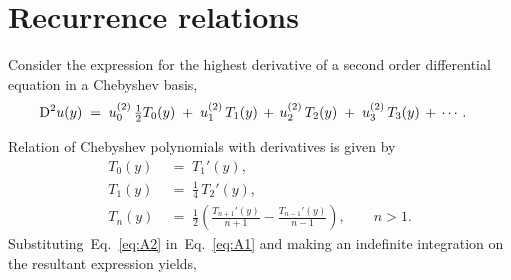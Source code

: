 \documentclass[%
secnumarabic,%
 amssymb, amsmath,%
 aps,prf,superscriptaddress,longbibliography
frontmatterverbose,
]{revtex4-2}
\begin{document}
\section{Recurrence relations}\label{app:ind-int}
Consider the expression for the highest derivative of a second order differential equation in a Chebyshev basis,
\begin{align}\label{eq:A1}
  \mathrm D^2 u (y) \;&=\; u_0^{(2)} \,\tfrac{1}{2}T_0(y) \;+\; u_1^{(2)}\,T_1(y) \,+\, u_2^{(2)}\,T_2(y) \;+\; u_3^{(2)}\,T_3(y) \,+\, \cdots.
\end{align}

Relation of Chebyshev polynomials with derivatives is given by~\cite[Equation 3.25]{chebExpanExact}
\begin{subequations}\label{eq:A2}
\begin{align}
  T_0(y) \;&=\; T_1'(y),\\
  T_1(y) \;&=\; \tfrac{1}{4}\,T_2'(y),\\
  T_n(y) \;&=\; \tfrac{1}{2}\left( \frac{T_{n+1}'(y)}{n+1} - \frac{T_{n-1}'(y)}{n-1}\right), \qquad n > 1.
\end{align}
\end{subequations}
Substituting~Eq.~\eqref{eq:A2} in~Eq.~\eqref{eq:A1} and making an indefinite integration on the resultant expression yields,
\end{document}
